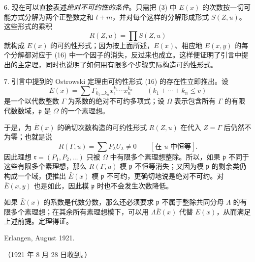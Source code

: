 6. 现在可以直接表述\emph{绝对不可约性的条件}。只需把 (3) 中 $E(x)$ 的次数按一切可能方式分解为两个正整数之和 $l+m$，并对每个这样的分解形成形式 $S(Z,u)$。这些形式的乘积
\begin{equation}
 R(Z,u)=\prod S(Z,u)
\tag{16}
\end{equation}
就构成 $E(x)$ 的可约性形式；因为按上面所述，$E(x)$、相应地 $E(x,y)$ 的每个分解都对应于 (16) 中一个因子的消失，反过来也成立。这样便证明了引言中提出的主定理，同时也说明了如何用有限多个步骤实际构造可约性形式。

7. 引言中提到的 Ostrowski 定理由可约性形式 (16) 的存在性立即推出。设
\[
 \bar E(x)=\sum \Gamma_{k_1\ldots k_n}x_1^{k_1}\cdots x_n^{k_n}
 \qquad(k_1+\cdots+k_n\le v)
\]
是一个以代数整数 $\Gamma$ 为系数的绝对不可约多项式；设 $\Omega$ 表示包含所有 $\Gamma$ 的有限代数数域，$\mathfrak p$ 是 $\Omega$ 的一个素理想。

于是，为 $\bar E(x)$ 的确切次数构造的可约性形式 $R(Z,u)$ 在代入 $Z=\Gamma$ 后仍然不为零；也就是说
\[
 R(\Gamma,u)=\sum P_\lambda U_\lambda\ne0\qquad[\text{在 }u\text{ 中恒等}].
\]
因此理想 $\mathfrak r=(P_1,P_2,\ldots)$ 只被 $\Omega$ 中有限多个素理想整除。所以，如果 $\mathfrak p$ 不同于这些有限多个素理想，那么 $R(\Gamma,u)$ 模 $\mathfrak p$ 不恒等消失；又因为模 $\mathfrak p$ 的剩余类仍构成一个域，便推出 $\bar E(x)$ 模 $\mathfrak p$ 不可约，更确切地说是绝对不可约。对 $\bar E(x,y)$ 也是如此，因此模 $\mathfrak p$ 时也不会发生次数降低。

如果 $\bar E(x)$ 的系数是代数分数，那么还必须要求 $\mathfrak p$ 不属于整除共同分母 $\Lambda$ 的有限多个素理想；在其余所有素理想模下，可以用 $\Lambda\bar E(x)$ 代替 $E(x)$，从而满足上述前提。定理得证。

\begin{flushleft}
Erlangen, August 1921.
\end{flushleft}
\begin{center}
（1921 年 8 月 28 日收到。）
\end{center}

\clearpage
